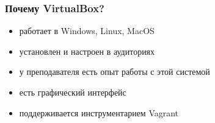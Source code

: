 
\begin{frame}
\frametitle{Почему VirtualBox?}
\begin{itemize}
\item работает в Windows, Linux, MacOS
\item установлен и настроен в аудиториях
\item у преподавателя есть опыт работы с этой системой
\item есть графический интерфейс
\item поддерживается инструментарием Vagrant
\end{itemize}
\end{frame}